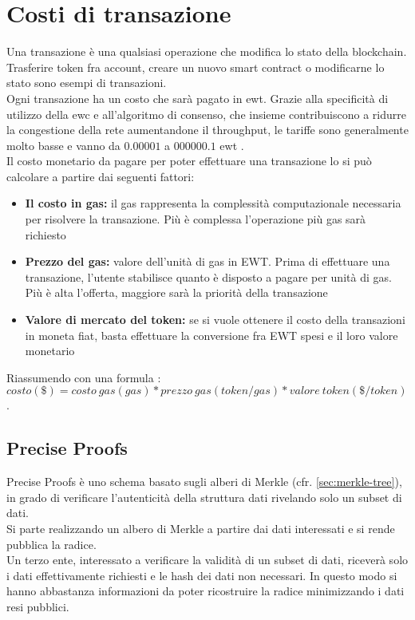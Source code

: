 \section{Costi di transazione}
Una transazione è una qualsiasi operazione che modifica lo stato della blockchain. Trasferire token fra account, creare un nuovo smart contract o modificarne lo stato sono esempi di transazioni. \\
Ogni transazione ha un costo che sarà pagato in \gls{ewt}.
Grazie alla specificità di utilizzo della \gls{ewc} e all'algoritmo di consenso, che insieme contribuiscono a ridurre la congestione della rete aumentandone il throughput,
le tariffe sono generalmente molto basse e vanno da $0.00001$ a $000000.1$ \gls{ewt} \cite{art:manage-costs}. \\
Il costo monetario da pagare per poter effettuare una transazione lo si può calcolare a partire dai seguenti fattori:

\begin{itemize}
    \item \textbf{Il costo in gas:} il gas rappresenta la complessità computazionale necessaria per risolvere la transazione. Più è complessa l'operazione più gas sarà richiesto
    \item \textbf{Prezzo del gas:} valore dell'unità di gas in EWT. Prima di effettuare una transazione, l'utente stabilisce quanto è disposto a pagare per unità di gas. Più è alta l'offerta, maggiore sarà la priorità della transazione
    \item \textbf{Valore di mercato del token:} se si vuole ottenere il costo della transazioni in moneta fiat, basta effettuare la conversione fra EWT spesi e il loro valore monetario
\end{itemize}

Riassumendo con una formula \cite{wiki:ew-transaction-cost}: \\
$ costo(\$) = costo\ gas(gas) * prezzo\ gas(token/gas) * valore\ token (\$/token) $.

\subsection{Precise Proofs}
Precise Proofs è uno schema basato sugli alberi di Merkle (cfr. \autoref{sec:merkle-tree}), in grado di verificare l'autenticità della struttura dati rivelando solo un subset di dati. \\
Si parte realizzando un albero di Merkle a partire dai dati interessati e si rende pubblica la radice. \\
Un terzo ente, interessato a verificare la validità di un subset di dati, riceverà solo i dati effettivamente richiesti e le hash dei dati non necessari.
In questo modo si hanno abbastanza informazioni da poter ricostruire la radice minimizzando i dati resi pubblici.

